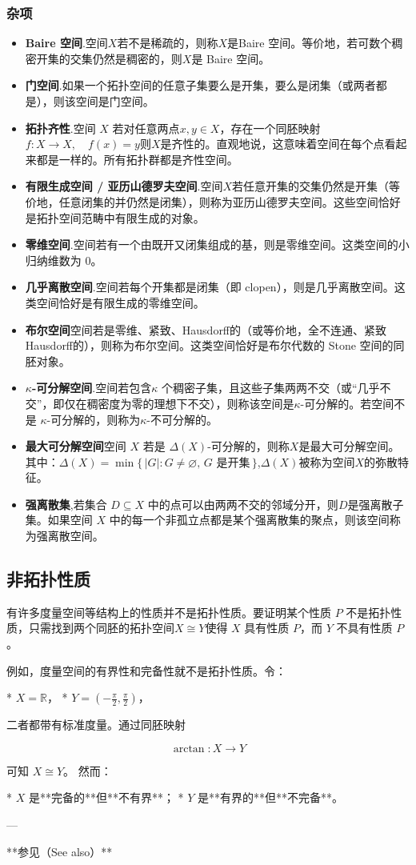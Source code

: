 \subsubsection{杂项}
\begin{itemize}
\item \textbf{Baire 空间}.空间$X$若不是稀疏的，则称$X$是Baire 空间。等价地，若可数个稠密开集的交集仍然是稠密的，则$X$是 Baire 空间。
\item \textbf{门空间}.如果一个拓扑空间的任意子集要么是开集，要么是闭集（或两者都是），则该空间是门空间。

\item \textbf{拓扑齐性}.空间 $X$ 若对任意两点$x, y \in X$，存在一个同胚映射$f: X \to X,\quad f(x) = y$则$X$是齐性的。直观地说，这意味着空间在每个点看起来都是一样的。所有拓扑群都是齐性空间。
\item \textbf{有限生成空间 / 亚历山德罗夫空间}.空间$X$若任意开集的交集仍然是开集（等价地，任意闭集的并仍然是闭集），则称为亚历山德罗夫空间。这些空间恰好是拓扑空间范畴中有限生成的对象。
\item \textbf{零维空间}.空间若有一个由既开又闭集组成的基，则是零维空间。这类空间的小归纳维数为 0。
\item \textbf{几乎离散空间}.空间若每个开集都是闭集（即 clopen），则是几乎离散空间。这类空间恰好是有限生成的零维空间。
\item \textbf{布尔空间}空间若是零维、紧致、Hausdorff的（或等价地，全不连通、紧致Hausdorff的），则称为布尔空间。这类空间恰好是布尔代数的 Stone 空间的同胚对象。
\item \textbf{$\kappa$-可分解空间}.空间若包含$\kappa$ 个稠密子集，且这些子集两两不交（或“几乎不交”，即仅在稠密度为零的理想下不交），则称该空间是$\kappa$-可分解的。若空间不是 $\kappa$-可分解的，则称为$\kappa$-不可分解的。
\item \textbf{最大可分解空间}空间 $X$ 若是 $\Delta(X)$-可分解的，则称$X$是最大可分解空间。其中：$\Delta(X) = \min\{\,|G| : G \neq \varnothing, \, G \text{ 是开集}\,\}$,$\Delta(X)$被称为空间$X$的弥散特征。
\item \textbf{强离散集},若集合 $D \subseteq X$ 中的点可以由两两不交的邻域分开，则$D$是强离散子集。如果空间 $X$ 中的每一个非孤立点都是某个强离散集的聚点，则该空间称为强离散空间。
\end{itemize}
\subsection{非拓扑性质}
有许多度量空间等结构上的性质并不是拓扑性质。要证明某个性质 $P$ 不是拓扑性质，只需找到两个同胚的拓扑空间$X \cong Y$使得 $X$ 具有性质 $P$，而 $Y$ 不具有性质 $P$。

例如，度量空间的有界性和完备性就不是拓扑性质。令：

* $X = \mathbb{R}$，
* $Y = \left(-\tfrac{\pi}{2}, \tfrac{\pi}{2}\right)$，

二者都带有标准度量。通过同胚映射

$$
\arctan: X \to Y
$$

可知 $X \cong Y$。
然而：

* $X$ 是**完备的**但**不有界**；
* $Y$ 是**有界的**但**不完备**。

---

**参见（See also）**
